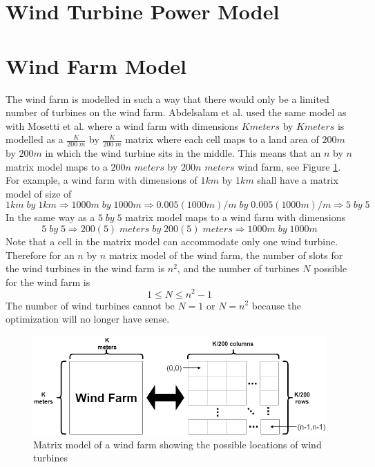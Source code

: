\section{Wind Turbine Power Model}
    

\section{Wind Farm Model}
    The wind farm is modelled in such a way that there would only be a limited number of turbines on the wind farm. Abdelsalam et al. \cite{this} used the same model as with Mosetti et al. \cite{windturbine5} where a wind farm with dimensions $K meters$ by $K meters$ is modelled as a $\frac{K}{200\;m}$ by $\frac{K}{200\;m}$ matrix where each cell maps to a land area of $200m$ by $200m$ in which the wind turbine sits in the middle. This means that an $n$ by $n$ matrix model maps to a $200n$ $meters$ by $200n$ $meters$ wind farm, see Figure \ref{windFarmModel}. For example, a wind farm with dimensions of $1km$ by $1km$ shall have a matrix model of size of
    \begin{equation}
        1km\;by\;1km\Rightarrow 1000m\;by\;1000m\Rightarrow 0.005(1000m)/m\;by\;0.005(1000m)/m\Rightarrow 5\;by\;5
    \end{equation}
    In the same way as a $5\;by\;5$ matrix model maps to a wind farm with dimensions
    \begin{equation}
        5\;by\;5\Rightarrow 200(5)\;meters\;by\;200(5)\;meters\Rightarrow 1000m\;by\;1000m
    \end{equation}
    Note that a cell in the matrix model can accommodate only one wind turbine. Therefore for an $n$ by $n$ matrix model of the wind farm, the number of slots for the wind turbines in the wind farm is $n^2$, and the number of turbines $N$ possible for the wind farm is
    \begin{equation}
        1\leq N\leq n^2-1
    \end{equation}
    The number of wind turbines cannot be $N=1$ or $N=n^2$ because the optimization will no longer have sense.
    
    \begin{figure}[h]
        \centering
        \includegraphics[width=\linewidth]{Figures/windFarmModel.png}
        \caption{Matrix model of a wind farm showing the possible locations of wind turbines}
        \label{windFarmModel}
    \end{figure}
    
